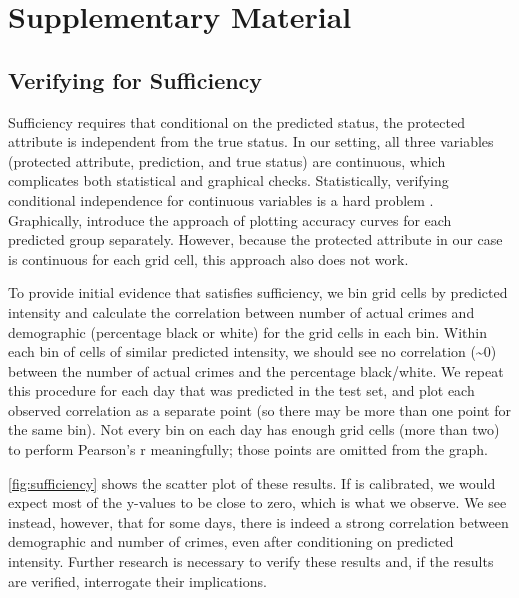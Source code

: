 \chapter{Supplementary Material} \label{app:math}

\section{Verifying \pp for Sufficiency} \label{sec:sufficiency}

Sufficiency requires that conditional on the predicted status, the protected attribute is independent from the true status. In our setting, all three variables (protected attribute, prediction, and true status) are continuous, which complicates both statistical and graphical checks. Statistically, verifying conditional independence for continuous variables is a hard problem \citep{bergsma_testing_2004}. Graphically, \citet{barocas_fairness_2018} introduce the approach of plotting accuracy curves for each predicted group separately. However, because the protected attribute in our case is continuous for each grid cell, this approach also does not work.

To provide initial evidence that \pp satisfies sufficiency, we bin grid cells by predicted intensity and calculate the correlation between number of actual crimes and demographic (percentage black or white) for the grid cells in each bin. Within each bin of cells of similar predicted intensity, we should see no correlation (\textasciitilde 0) between the number of actual crimes and the percentage black/white. We repeat this procedure for each day that was predicted in the test set, and plot each observed correlation as a separate point (so there may be more than one point for the same bin). Not every bin on each day has enough grid cells (more than two) to perform Pearson's r meaningfully; those points are omitted from the graph.

\autoref{fig:sufficiency} shows the scatter plot of these results. If \pp is calibrated, we would expect most of the y-values to be close to zero, which is what we observe. We see instead, however, that for some days, there is indeed a strong correlation between demographic and number of crimes, even after conditioning on predicted intensity. Further research is necessary to verify these results and, if the results are verified, interrogate their implications.

